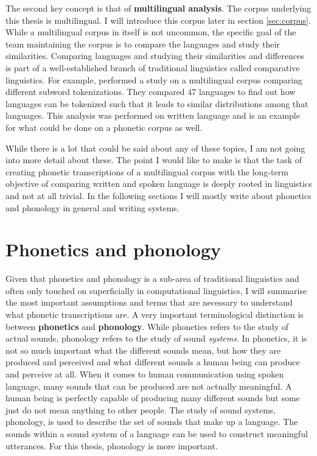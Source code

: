 The second key concept is that of \textbf{multilingual analysis}. The corpus underlying this thesis is multilingual. I will introduce this corpus later in section \ref{sec:corpus}. While a multilingual corpus in itself is not uncommon, the specific goal of the team maintaining the corpus is to compare the languages and study their similarities. Comparing languages and studying their similarities and differences is part of a well-established branch of traditional linguistics called comparative linguistics. For example, \citet{gutierrez-vasques-etal-2021-characters} performed a study on a multilingual corpus comparing different subword tokenizations. They compared 47 languages to find out how languages can be tokenized such that it leads to similar distributions among that languages. This analysis was performed on written language and is an example for what could be done on a phonetic corpus as well.

While there is a lot that could be said about any of these topics, I am not going into more detail about these. The point I would like to make is that the task of creating phonetic transcriptions of a multilingual corpus with the long-term objective of comparing written and spoken language is deeply rooted in linguistics and not at all trivial. In the following sections I will mostly write about phonetics and phonology in general and writing systems.

\section{Phonetics and phonology}
\label{phonetics}
Given that phonetics and phonology is a sub-area of traditional linguistics and often only touched on superficially in computational linguistics, I will summarise the most important assumptions and terms that are necessary to understand what phonetic transcriptions are.
A very important terminological distinction is between \textbf{phonetics} and \textbf{phonology}. While phonetics refers to the study of actual sounds, phonology refers to the study of sound \textit{systems}. In phonetics, it is not so much important what the different sounds mean, but how they are produced and perceived and what different sounds a human being can produce and perceive at all. When it comes to human communication using spoken language, many sounds that can be produced are not actually meaningful. A human being is perfectly capable of producing many different sounds but some just do not mean anything to other people. The study of sound systems, phonology, is used to describe the set of sounds that make up a language. The sounds within a sound system of a language can be used to construct meaningful utterances. For this thesis, phonology is more important.

